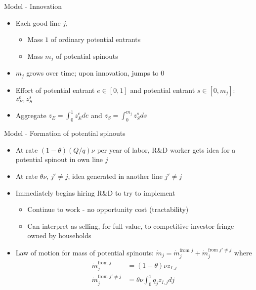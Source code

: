 \documentclass[english,usenames,dvipsnames]{beamer}
\begin{document}
\begin{frame}{Model - Innovation}
\begin{itemize}
	\item Each good line $j$,
	\begin{itemize}
		\item Mass $1$ of ordinary \alert{potential entrants}
		\item Mass $m_j$ of \alert{potential spinouts} 
	\end{itemize}
	\item $m_j$ grows over time; upon innovation, jumps to $0$
	\item Effort of potential entrant $e \in [0,1]$ and potential entrant $s \in [0,m_j]$: $z_E^e, z_S^s$ 
	\item Aggregate $z_E = \int_0^1 z_E^e de$ and $z_S = \int_0^{m_j} z_S^s ds$ 
\end{itemize}
\end{frame}

\begin{frame}{Model - Formation of potential spinouts}
\begin{itemize}
	\item At rate $(1-\theta)(Q/q) \nu$ per year of labor, R\&D worker gets idea for a potential spinout in own line $j$
	\item At rate $\theta \nu$,  $j' \ne j$, idea generated in another line $j' \ne j$
	\item Immediately begins hiring R\&D to try to implement
	\begin{itemize}
		\item Continue to work - no opportunity cost (tractability) 
		\item Can interpret as selling, for full value, to competitive investor fringe owned by households
	\end{itemize}
	\item Law of motion for mass of potential spinouts: $\dot{m}_j = \dot{m}_j^{\textrm{from $j$}} + \dot{m}_j^{\textrm{from $j' \ne j$}}$ where
	\begin{align*}
	\dot{m}_j^{\textrm{from $j$}}&= (1-\theta) \nu z_{I,j}\\
	\dot{m}_j^{\textrm{from $j' \ne j$}} &= \theta \nu \int_0^1 q_j z_{I,j} dj
	\end{align*}
\end{itemize}
\end{frame}
\end{document}
